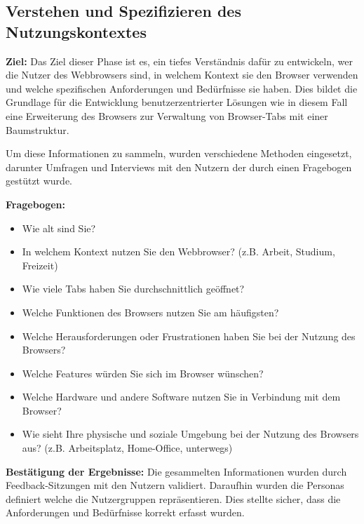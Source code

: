 \subsection{Verstehen und Spezifizieren des Nutzungskontextes}

\textbf{Ziel:} 
Das Ziel dieser Phase ist es, ein tiefes Verständnis dafür zu entwickeln, wer die Nutzer des Webbrowsers sind, in welchem Kontext sie den Browser verwenden und welche spezifischen Anforderungen und Bedürfnisse sie haben. 
Dies bildet die Grundlage für die Entwicklung benutzerzentrierter Lösungen wie in diesem Fall eine Erweiterung des Browsers zur Verwaltung von Browser-Tabs mit einer Baumstruktur.

Um diese Informationen zu sammeln, wurden verschiedene Methoden eingesetzt, darunter Umfragen und Interviews mit den Nutzern der durch einen Fragebogen gestützt wurde.


\textbf{Fragebogen:}
\begin{itemize}
    \item Wie alt sind Sie?
    \item In welchem Kontext nutzen Sie den Webbrowser? (z.B. Arbeit, Studium, Freizeit)
    \item Wie viele Tabs haben Sie durchschnittlich geöffnet?
    \item Welche Funktionen des Browsers nutzen Sie am häufigsten?
    \item Welche Herausforderungen oder Frustrationen haben Sie bei der Nutzung des Browsers?
    \item Welche Features würden Sie sich im Browser wünschen?
    \item Welche Hardware und andere Software nutzen Sie in Verbindung mit dem Browser?
    \item Wie sieht Ihre physische und soziale Umgebung bei der Nutzung des Browsers aus? (z.B. Arbeitsplatz, Home-Office, unterwegs)
\end{itemize}

\textbf{Bestätigung der Ergebnisse:}
Die gesammelten Informationen wurden durch Feedback-Sitzungen mit den Nutzern validiert.
Daraufhin wurden die Personas definiert welche die Nutzergruppen repräsentieren. 
Dies stellte sicher, dass die Anforderungen und Bedürfnisse korrekt erfasst wurden.

